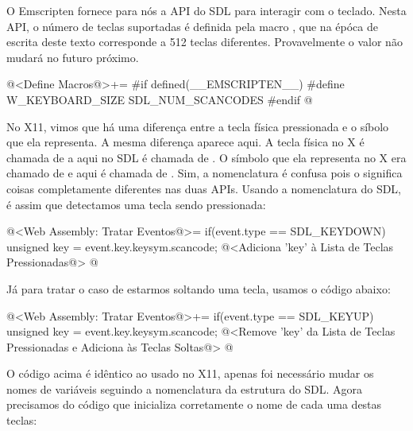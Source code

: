 
O Emscripten fornece para nós a API do SDL para interagir com o
teclado. Nesta API, o número de teclas suportadas é definida pela
macro , que na épóca de escrita deste
texto corresponde a 512 teclas diferentes. Provavelmente o valor não
mudará no futuro próximo.

\iniciocodigo
@<Define Macros@>+=
#if defined(__EMSCRIPTEN__)
#define W_KEYBOARD_SIZE SDL_NUM_SCANCODES
#endif
@
\fimcodigo

No X11, vimos que há uma diferença entre a tecla física pressionada e
o síbolo que ela representa. A mesma diferença aparece aqui. A tecla
física no X é chamada de  a aqui no SDL é chamada
de . O símbolo que ela representa no X era
chamado de  e aqui é chamada
de . Sim, a nomenclatura é confusa pois
o  significa coisas completamente diferentes nas
duas APIs. Usando a nomenclatura do SDL, é assim que detectamos uma
tecla sendo pressionada:

\iniciocodigo
@<Web Assembly: Tratar Eventos@>=
if(event.type == SDL_KEYDOWN){
  unsigned key = event.key.keysym.scancode;
  @<Adiciona 'key' à Lista de Teclas Pressionadas@>
}
@
\fimcodigo

Já para tratar o caso de estarmos soltando uma tecla, usamos o código
abaixo:

\iniciocodigo
@<Web Assembly: Tratar Eventos@>+=
if(event.type == SDL_KEYUP){
  unsigned key = event.key.keysym.scancode;
  @<Remove 'key' da Lista de Teclas Pressionadas e Adiciona às Teclas Soltas@>
}
@
\fimcodigo

O código acima é idêntico ao usado no X11, apenas foi necessário mudar
os nomes de variáveis seguindo a nomenclatura da estrutura do
SDL. Agora precisamos do código que inicializa corretamente o nome de
cada uma destas teclas:

